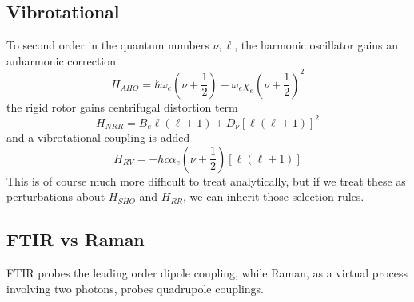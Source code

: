 \documentclass[12pt]{article}
\begin{document}
\subsection{Vibrotational}
To second order in the quantum numbers \( \nu, \ell \), the harmonic oscillator gains an anharmonic correction
\[ H_{AHO}=\hbar\omega_e \left(\nu+\frac{1}{2}\right)-\omega_e\chi_e\left( \nu+\frac{1}{2} \right)^2 \]
the rigid rotor gains centrifugal distortion term
\[ H_{NRR}=B_e\ell(\ell+1) +D_\nu[\ell(\ell+1)]^2\]
and a vibrotational coupling is added
\[ H_{RV}=-hc\alpha_e\left( \nu+\frac{1}{2} \right)[\ell(\ell+1)]\]
This is of course much more difficult to treat analytically, but if we treat these as perturbations about \( H_{SHO} \) and \( H_{RR} \), we can inherit those selection rules.

\subsection{FTIR vs Raman}
FTIR probes the leading order dipole coupling, while Raman, as a virtual process involving two photons, probes quadrupole couplings.
\end{document}
